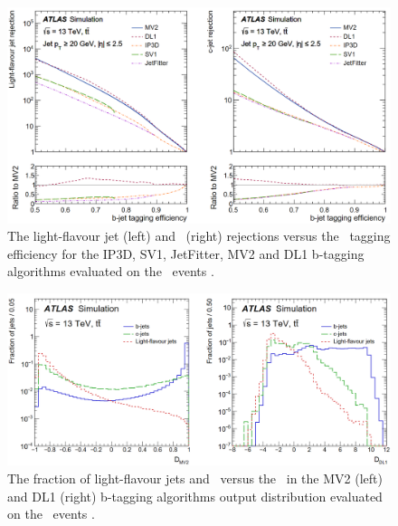 \documentclass[letterpaper,12pt]{article}
\begin{document}
\begin{figure}[!h]
	\includegraphics[width=1\textwidth]{FTAG_plots/b-tagging-perfermance.png}
	\caption{The light-flavour jet (left) and \cjet\ (right) rejections versus 
	the \bjet\ tagging efficiency for the IP3D, SV1, JetFitter, MV2 and
	DL1 b-tagging algorithms evaluated on the \ttbar\ events
	 \cite{FTAG-2018-01}.}\label{fig:b-tagging-performance}
\end{figure}


\begin{figure}[!h]
	\includegraphics[width=1\textwidth]{FTAG_plots/b-tagging-score.png}
	\caption{The fraction of light-flavour jets and \cjets\ versus 
	the \bjets\ in the MV2 (left) and
	DL1 (right) b-tagging algorithms output distribution 
	evaluated on the \ttbar\ events
	 \cite{FTAG-2018-01}.}\label{fig:b-tagging-score}
\end{figure}


\end{document}
